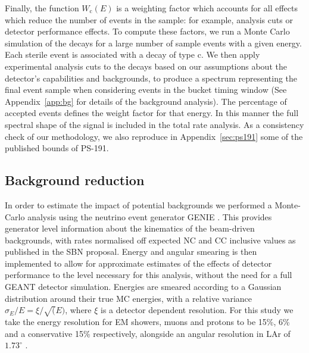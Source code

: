 \documentclass[11pt, a4paper]{article}
\newcommand{\refapp}[1]{Appendix~\ref{#1}}
\begin{document}
Finally, the function $W_\text{c}(E)$ is a weighting factor which accounts for
all effects which reduce the number of events in the sample: for example,
analysis cuts or detector performance effects. 
%
To compute these factors, we run a Monte Carlo simulation of the decays for a
large number of sample events with a given energy. Each sterile event is
associated with a decay of type $\text{c}$. We then apply experimental analysis
cuts to the decays based on our assumptions about the detector's capabilities
and backgrounds, to produce a spectrum representing the final event sample when
considering events in the bucket timing window (See \refapp{app:bg} for details
of the background analysis). The percentage of accepted events defines the
weight factor for that energy. In this manner the full spectral shape of the signal is
included in the total rate analysis. As a consistency check of our methodology, we
also reproduce in \refapp{sec:ps191} some of the published bounds of PS-191. 

\subsection{\label{sec:backgroundestimate}Background reduction}

In order to estimate the impact of potential backgrounds we performed a
Monte-Carlo analysis using the neutrino event generator GENIE
\cite{Andreopoulos:2009rq}. This provides generator level information
about the kinematics of the beam-driven backgrounds, with rates normalised off
expected NC and CC inclusive values as published in the SBN proposal. Energy
and angular smearing is then implemented to allow for approximate estimates of
the effects of detector performance to the level necessary for this analysis,
without the need for a full GEANT detector simulation. Energies are smeared
according to a Gaussian distribution around their true MC energies, with a
relative variance $\sigma_E/E = \xi/ \sqrt(E) $, where $\xi$ is a detector
dependent resolution.  For this study we take the energy resolution for EM
showers, muons and protons to be 15\%, 6\% and a conservative 15\%
respectively, alongside an angular resolution in LAr of $1.73^{\circ}$
\cite{Antonello:2015lea}. 
\end{document}
